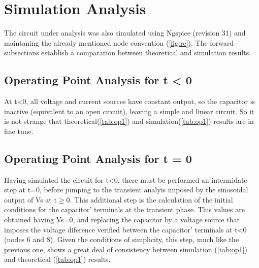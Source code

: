 \section{Simulation Analysis}
\label{sec:simulation}

The circuit under analysis was also simulated using Ngspice (revision 31) and maintaning the already mentioned node convention (\ref{fig:rc}). The forward subsections establish a comparation between theoretical and simulation results.

\subsection{Operating Point Analysis for t < 0}

At t<0, all voltage and current sources have constant output, so the capacitor is inactive (equivalent to an open circuit), leaving a simple and linear circuit. So it is not strange that theoretical(\ref{tab:op1}) and simulation(\ref{tab:op1}) results are in fine tune.

\begin{table}[h]
  \centering
 \caption{Simulation results. A variable preceded by @ is of type {\em current}
   and expressed in Ampere; other variables are of type {\it voltage} and expressed in
   Volt.}
  \label{tab:op1}
\end{table}

\subsection{Operating Point Analysis for t = 0}

Having simulated the circuit for t<0, there must be performed an intermidate step at t=0, before jumping to the transient analyis imposed by the sinosoidal output of Vs at t$\geq$0. This additional step is the calculation of the initial conditions for the capacitor' terminals at the transient phase. This values are obtained having Vs=0, and replacing the capacitor by a voltage source that imposes the voltage diference verified between the capacitor' terminals at t<0 (nodes 6 and 8). Given the conditions of simplicity, this step, much like the previous one, shows a great deal of consistency between simulation (\ref{tab:op1}) and theoretical (\ref{tab:op1}) results. 

